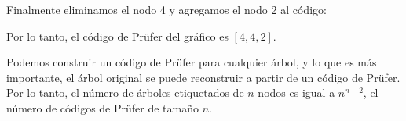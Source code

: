 Finalmente eliminamos el nodo 4 y agregamos el nodo 2 al código:
\begin{center}
\end{center}

Por lo tanto, el código de Prüfer del gráfico es $[4,4,2]$.

Podemos construir un código de Prüfer para cualquier árbol,
y lo que es más importante,
el árbol original se puede reconstruir
a partir de un código de Prüfer.
Por lo tanto, el número de árboles etiquetados
de $n$ nodos es igual a
$n^{n-2}$, el número de códigos de Prüfer
de tamaño $n$.
